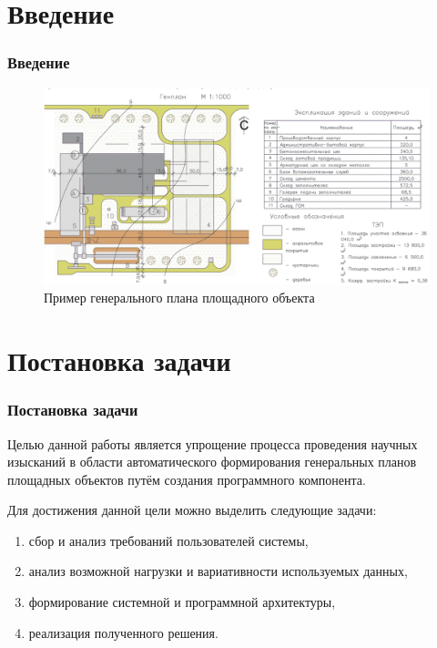 \section{Введение}

\begin{frame}
\frametitle{Введение}
\begin{figure}
    \includegraphics[scale=.5]{pictures/common/site_plan}
    \caption{Пример генерального плана площадного объекта}
\end{figure}
\end{frame}


\section{Постановка задачи}

\begin{frame}
\frametitle{Постановка задачи}
\textcolor{ITMOred}{Целью} данной работы является упрощение процесса проведения научных изысканий
в области автоматического формирования генеральных планов площадных объектов
путём создания программного компонента.
\vskip 5mm

Для достижения данной цели можно выделить следующие \textcolor{ITMOred}{задачи}:
\begin{enumerate}
    \item сбор и анализ требований пользователей системы,
    \item анализ возможной нагрузки и вариативности используемых данных,
    \item формирование системной и программной архитектуры,
    \item реализация полученного решения.
\end{enumerate}
\end{frame}
